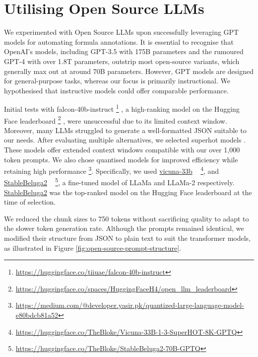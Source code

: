\section{Utilising Open Source LLMs}

We experimented with Open Source LLMs upon successfully leveraging GPT models for automating formula annotations. It is essential to recognise that OpenAI's models, including GPT-3.5 with 175B parameters and the rumoured GPT-4 with over 1.8T parameters, outstrip most open-source variants, which generally max out at around 70B parameters. However, GPT models are designed for general-purpose tasks, whereas our focus is primarily instructional. We hypothesised that instructive models could offer comparable performance.

Initial tests with falcon-40b-instruct \footnote{\url{https://huggingface.co/tiiuae/falcon-40b-instruct}} \citep{falcon40b, refinedweb, xu2023baize}, a high-ranking model on the Hugging Face leaderboard \footnote{\url{https://huggingface.co/spaces/HuggingFaceH4/open_llm_leaderboard}} \citep{jain2022hugging}, were unsuccessful due to its limited context window. Moreover, many LLMs struggled to generate a well-formatted JSON suitable to our needs. After evaluating multiple alternatives, we selected superhot models \citep{chen2023extending}. These models offer extended context windows compatible with our over 1,000 token prompts. We also chose quantised models for improved efficiency while retaining high performance \footnote{\url{https://medium.com/@developer.yasir.pk/quantized-large-language-model-e80bdcb81a52}}. Specifically, we used \href{https://huggingface.co/TheBloke/Vicuna-33B-1-3-SuperHOT-8K-GPTQ}{vicuna-33b} ~\citep{zheng2023judging} \footnote{\url{https://huggingface.co/TheBloke/Vicuna-33B-1-3-SuperHOT-8K-GPTQ}}, and \href{https://huggingface.co/TheBloke/StableBeluga2-70B-GPTQ}{StableBeluga2} ~\citep{StableBelugaModels, touvron2023llama, mukherjee2023orca} \footnote{\url{https://huggingface.co/TheBloke/StableBeluga2-70B-GPTQ}}, a fine-tuned model of LLaMa and LLaMa-2 respectively. \href{https://huggingface.co/TheBloke/StableBeluga2-70B-GPTQ}{StableBeluga2} was the top-ranked model on the Hugging Face leaderboard at the time of selection.

We reduced the chunk sizes to 750 tokens without sacrificing quality to adapt to the slower token generation rate. Although the prompts remained identical, we modified their structure from JSON to plain text to suit the transformer models, as illustrated in Figure \ref{fig:open-source-prompt-structure}. 

